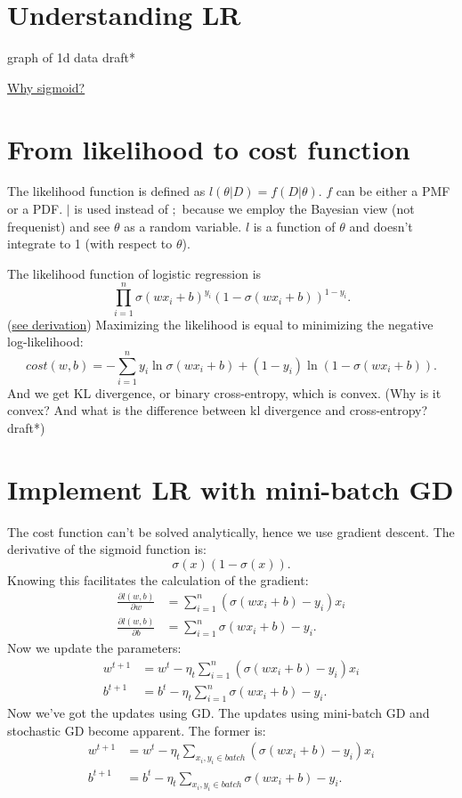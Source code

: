 \documentclass{report}
\begin{document}
  \section{Understanding LR}
  graph of 1d data draft*

  \href{https://towardsdatascience.com/why-sigmoid-a-probabilistic-perspective-42751d82686}{Why sigmoid?}
  \section{From likelihood to cost function}
  The likelihood function is defined as $l\left( \theta|D \right) = f\left( D|\theta\right) $. $f$ can be either a PMF or a PDF. $|$ is used instead of $;$ because we employ the Bayesian view (not frequenist) and see $\theta$ as a random variable. $l$ is a function of $\theta$ and doesn't integrate to 1 (with respect to $\theta$).

The likelihood function of logistic regression is 
\begin{displaymath}
\prod_{i=1}^{n} {\sigma\left( wx_{i} + b \right)^{y_{i}}\left( 1 - \sigma\left( wx_{i} + b\right)\right)^{1 - y_{i} }}.
\end{displaymath} (\href{https://zstevenwu.com/courses/s20/csci5525/resources/slides/lecture05.pdf}{see derivation})
Maximizing the likelihood is equal to minimizing the negative log-likelihood: \[
	cost\left( w, b \right) = -\sum_{i=1}^{n} y_{i} \ln \sigma \left(wx_{i} + b\right) + \left( 1 - y_{i} \right) \ln \left(1 - \sigma\left(wx_{i} + b\right)\right)
.\] 
And we get KL divergence, or binary cross-entropy, which is convex. (Why is it convex? And what is the difference between kl divergence and cross-entropy? draft*)
  \section{Implement LR with mini-batch GD}The cost function can't be solved analytically, hence we use gradient descent.
  The derivative of the sigmoid function is:
  \[
  \sigma(x)(1 - \sigma(x))
  .\] 
  Knowing this facilitates the calculation of the gradient: 
  \begin{align*}
	  \frac{\partial l(w, b)}{\partial w} & = \sum_{i = 1}^{n} (\sigma(wx_i + b) - y_i) x_i \\
\frac{\partial l(w, b)}{\partial b} & = \sum_{i = 1}^{n} \sigma(wx_i + b) - y_i. 
  \end{align*}
  Now we update the parameters:
  \begin{align*}
    w^{t+1} &= w^t - \eta_t \sum_{i=1}^{n} (\sigma(wx_i + b) - y_i) x_i \\
    b^{t+1} &= b^t - \eta_t \sum_{i=1}^{n} \sigma(wx_i + b) - y_i
  .\end{align*}
Now we've got the updates using GD. The updates using mini-batch GD and stochastic GD become apparent. The former is:
  \begin{align*}
    w^{t+1} &= w^t - \eta_t \sum_{x_i, y_i \in batch}(\sigma(wx_i + b) - y_i) x_i \\
    b^{t+1} &= b^t - \eta_t \sum_{x_i, y_i \in batch}\sigma(wx_i + b) - y_i
  .\end{align*}
\end{document}
